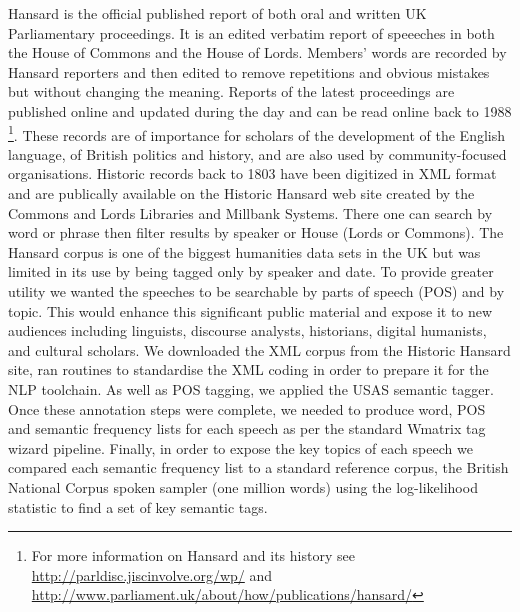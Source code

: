 Hansard is the official published report of both oral and written UK Parliamentary proceedings. It is an edited verbatim report of speeeches in both the House of Commons and the House of Lords. Members' words are recorded by Hansard reporters and then edited to remove repetitions and obvious mistakes but without changing the meaning. Reports of the latest proceedings are published online and updated during the day and can be read online back to 1988%
\footnote{For more information on Hansard and its history see \url{http://parldisc.jiscinvolve.org/wp/} and \url{http://www.parliament.uk/about/how/publications/hansard/}}. 
These records are of importance for scholars of the development of the English language, of British politics and history, and are also used by community-focused organisations.  Historic records back to 1803 have been digitized in XML format and are publically available on the Historic Hansard web site created by the Commons and Lords Libraries and Millbank Systems. There one can search by word or phrase then filter results by speaker or House (Lords or Commons). 
The Hansard corpus is one of the biggest humanities data sets in the UK but was limited in its use by being tagged only by speaker and date. To provide greater utility we wanted the speeches to be searchable by parts of speech (POS) and by topic. This would enhance this significant public material and expose it to new audiences
including linguists, discourse analysts, historians, digital humanists, and cultural scholars. 
We downloaded the XML corpus from the Historic Hansard site, ran routines to standardise the XML coding in order to prepare it for the NLP toolchain. As well as POS tagging, we applied the USAS semantic tagger. Once these annotation steps were complete, we needed to produce word, POS and semantic frequency lists for each speech as per the standard Wmatrix tag wizard pipeline. Finally, in order to expose the key topics of each speech we compared each semantic frequency list to a standard reference corpus, the British National Corpus spoken sampler (one million words) using the log-likelihood statistic to find a set of key semantic tags.




